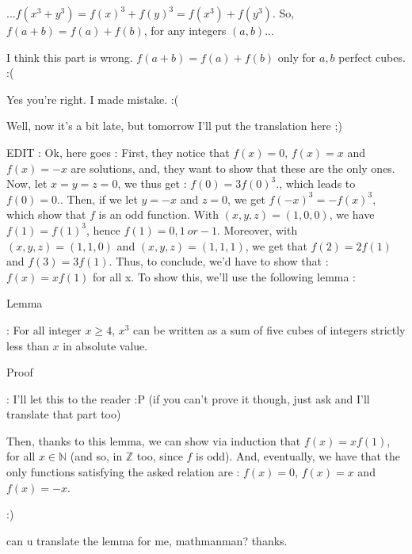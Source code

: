 \begin{solution}
	\begin{tcolorbox}...$ f(x^{3}+y^{3}) = f(x)^{3}+f(y)^{3}= f(x^{3})+f(y^{3})$. So, $ f(a+b) = f(a)+f(b)$, for any integers $ (a,b)$...\end{tcolorbox}

I think this part is wrong. $ f(a+b)=f(a)+f(b)$ only for $ a,b$ perfect cubes. :(
\end{solution}



\begin{solution}
	Yes you're right. I made mistake. :(
\end{solution}



\begin{solution}
	\begin{tcolorbox}Well, now it's a bit late, but tomorrow I'll put the translation here ;)


EDIT : Ok, here goes :
First, they notice that $f(x) = 0$, $f(x) = x$ and $f(x) = -x$ are solutions, and, they want to show that these are the only ones.
Now, let $x=y=z=0$, we thus get : $f(0) = 3f(0)^3$., which leads to $f(0)=0$..
Then, if we let $y=-x$ and $z=0$, we get $f(-x)^3 = -f(x)^3$, which show that $f$ is an odd function.
With $(x,y,z) = (1,0,0)$, we have $f(1) = f(1)^3$, hence $f(1) = 0, 1 \ or -1$.
Moreover, with $(x,y,z)=(1,1,0)$ and $(x,y,z)=(1,1,1)$, we get that $f(2) = 2f(1)$ and $f(3) = 3f(1)$.
Thus, to conclude, we'd have to show that : $f(x) = xf(1)$ for all x.
To show this, we'll use the following lemma :
\begin{bolded}Lemma\end{bolded} : For all integer $x \ge 4$, $x^3$ can be written as a sum of five cubes of integers strictly less than $x$ in absolute value.
\begin{bolded}Proof\end{bolded} : I'll let this to the reader  :P  (if you can't prove it though, just ask and I'll translate that part too)

Then, thanks to this lemma, we can show via induction that $f(x) = xf(1)$, for all $x \in \mathbb{N}$ (and so, in $\mathbb{Z}$ too, since $f$ is odd).
And, eventually, we have that the only functions satisfying the asked relation are : 
$f(x) = 0$, $f(x) = x$ and $f(x) = -x$.

:)\end{tcolorbox}
can u translate the lemma for me, mathmanman?
thanks.
\end{solution}



